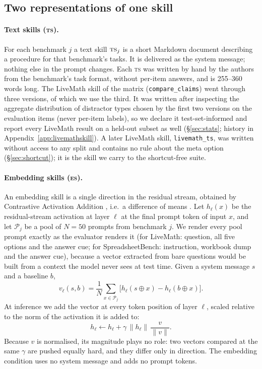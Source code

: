 \documentclass[11pt]{article}
\newcommand{\TS}{\textsc{ts}}
\newcommand{\ES}{\textsc{es}}
\begin{document}
\subsection{Two representations of one skill}

\paragraph{Text skills (\TS).} For each benchmark $j$ a text skill $\TS_j$ is a short Markdown
document describing a procedure for that benchmark's tasks. It is delivered as the system message;
nothing else in the prompt changes. Each \TS{} was written by hand by the authors from the benchmark's task format, without
per-item answers, and is 255--360 words long. The LiveMath skill of the matrix (\texttt{compare\_claims}) went
through three versions, of which we use the third. It was written after inspecting the aggregate
distribution of distractor types chosen by the first two versions on the evaluation items (never
per-item labels), so we declare it test-set-informed and report every LiveMath result on a held-out
subset as well (\S\ref{sec:stats}; history in Appendix~\ref{app:livemathskill}). A later LiveMath
skill, \texttt{livemath\_ts}, was written without access to any split and contains no rule about the
meta option (\S\ref{sec:shortcut}); it is the skill we carry to the shortcut-free suite.

\paragraph{Embedding skills (\ES).} An embedding skill is a single direction in the residual stream,
obtained by Contrastive Activation Addition \citep{panickssery2024caa}, i.e.\ a difference of means
\citep{marks2024geometry,arditi2024refusal}. Let $h_\ell(x)$ be the residual-stream activation at
layer $\ell$ at the final prompt token of input $x$, and let $\mathcal{P}_j$ be a pool of $N=50$
prompts from benchmark $j$. We render every pool prompt exactly as the evaluator renders it (for
LiveMath: question, all five options and the answer cue; for SpreadsheetBench: instruction, workbook
dump and the answer cue), because a vector extracted from bare questions would be built from a
context the model never sees at test time. Given a system message $s$ and a baseline $b$,
\begin{equation}
  v_\ell(s,b) = \frac{1}{N}\sum_{x\in\mathcal{P}_j}\big[h_\ell(s\oplus x) - h_\ell(b\oplus x)\big].
  \label{eq:caa}
\end{equation}
At inference we add the vector at every token position of layer $\ell$, scaled relative to the norm
of the activation it is added to:
\begin{equation}
  h_\ell \leftarrow h_\ell + \gamma\,\lVert h_\ell\rVert\,\frac{v}{\lVert v\rVert}.
  \label{eq:inject}
\end{equation}
Because $v$ is normalised, its magnitude plays no role: two vectors compared at the same $\gamma$ are
pushed equally hard, and they differ only in direction. The embedding condition uses no system
message and adds no prompt tokens.
\end{document}
